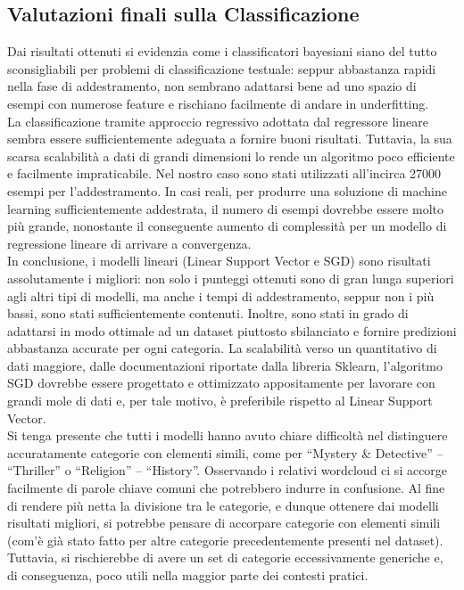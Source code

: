 \documentclass[12pt,oneside]{article}
\begin{document}
    \newpage
    \begin{enumerate}
    \subsection{Valutazioni finali sulla Classificazione}
    \begin{justify}
    Dai risultati ottenuti si evidenzia come i classificatori bayesiani siano del tutto sconsigliabili per problemi di classificazione testuale: seppur abbastanza rapidi nella fase di addestramento, non sembrano adattarsi bene ad uno spazio di esempi con numerose feature e rischiano facilmente di andare in underfitting.\\
    La classificazione tramite approccio regressivo adottata dal regressore lineare sembra essere sufficientemente adeguata a fornire buoni risultati. Tuttavia, la sua scarsa scalabilità a dati di grandi dimensioni lo rende un algoritmo poco efficiente e facilmente impraticabile. Nel nostro caso sono stati utilizzati all’incirca 27000 esempi per l’addestramento. In casi reali, per produrre una soluzione di machine learning sufficientemente addestrata, il numero di esempi dovrebbe essere molto più grande, nonostante il conseguente aumento di complessità per un modello di regressione lineare di arrivare a convergenza.\\
    In conclusione, i modelli lineari (Linear Support Vector e SGD) sono risultati assolutamente i migliori: non solo i punteggi ottenuti sono di gran lunga superiori agli altri tipi di modelli, ma anche i tempi di addestramento, seppur non i più bassi, sono stati sufficientemente contenuti. Inoltre, sono stati in grado di adattarsi in modo ottimale ad un dataset piuttosto sbilanciato e fornire predizioni abbastanza accurate per ogni categoria. La scalabilità verso un quantitativo di dati maggiore, dalle documentazioni riportate dalla libreria Sklearn, l’algoritmo SGD dovrebbe essere progettato e ottimizzato appositamente per lavorare con grandi mole di dati e, per tale motivo, è preferibile rispetto al Linear Support Vector.\\
    Si tenga presente che tutti i modelli hanno avuto chiare difficoltà nel distinguere accuratamente categorie con elementi simili, come per “Mystery \& Detective” – “Thriller” o “Religion” – “History”. Osservando i relativi wordcloud ci si accorge facilmente di parole chiave comuni che potrebbero indurre in confusione. Al fine di rendere più netta la divisione tra le categorie, e dunque ottenere dai modelli risultati migliori, si potrebbe pensare di accorpare categorie con elementi simili (com’è già stato fatto per altre categorie precedentemente presenti nel dataset). Tuttavia, si rischierebbe di avere un set di categorie eccessivamente generiche e, di conseguenza, poco utili nella maggior parte dei contesti pratici.
    \end{justify}
    \end{enumerate}
\end{document}
